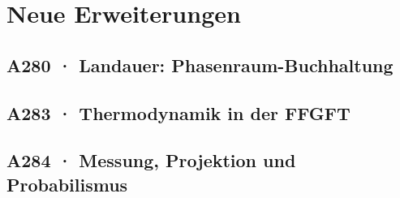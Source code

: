 \documentclass[11pt,twoside,openright]{book}
\begin{document}
\part{Neue Erweiterungen}

\chapter[A280 · Phasenraum-Buchhaltung (erweitert)]{A280 · Landauer: Phasenraum-Buchhaltung}


\chapter[A283 · Thermodynamik in der FFGFT]{A283 · Thermodynamik in der FFGFT}


\chapter[A284 · Messung, Projektion, Probabilismus]{A284 · Messung, Projektion und Probabilismus}


\end{document}
